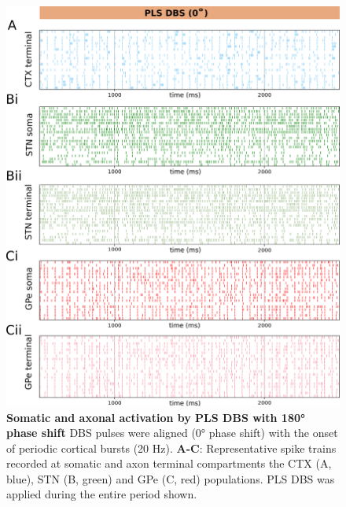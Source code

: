 \begin{figure}
\centering
\includegraphics[width=\textwidth]{ch_appendix/figs/fig_pls_ang-0_rastergrams.png}
\caption{
\textbf{Somatic and axonal activation by PLS DBS with \ang{180} phase shift}
DBS pulses were aligned (\ang{0} phase shift) with the onset of periodic cortical bursts (20 Hz).
\textbf{A-C}: Representative spike trains recorded at somatic and axon terminal compartments the CTX (A, blue), STN (B, green) and GPe (C, red) populations. PLS DBS was applied during the entire period shown.
}
\label{fig:pls_ang-0_rastergrams}
\end{figure}